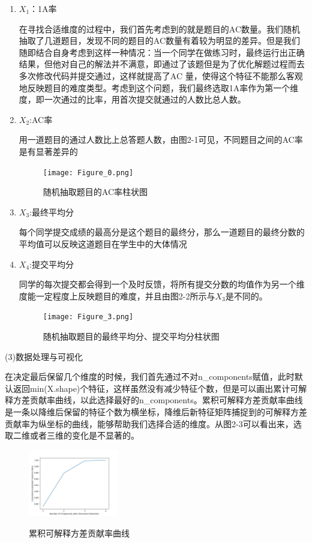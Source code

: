 \documentclass[UTF8]{ctexart}
\begin{document}
	\begin{enumerate}
		\item $X_1$：1A率
		\par 在寻找合适维度的过程中，我们首先考虑到的就是题目的AC数量。我们随机抽取了几道题目，发现不同的题目的AC数量有着较为明显的差异。但是我们随即结合自身考虑到这样一种情况：当一个同学在做练习时，最终运行出正确结果，但他对自己的解法并不满意，即通过了该题但是为了优化解题过程而去多次修改代码并提交通过，这样就提高了AC 量，使得这个特征不能那么客观地反映题目的难度类型。考虑到这个问题，我们最终选取1A率作为第一个维度，即一次通过的比率，用首次提交就通过的人数比总人数。
		\item $X_2$:AC率
		\par 用一道题目的通过人数比上总答题人数，由图2-1可见，不同题目之间的AC率是有显著差异的
		\begin{figure}[!htbp]
			\centering
			\texttt{[image: Figure\_0.png]}\\
			\caption{随机抽取题目的AC率柱状图}
		\end{figure}
		\item $X_3$:最终平均分
		\par 每个同学提交成绩的最高分是这个题目的最终分，那么一道题目的最终分数的平均值可以反映这道题目在学生中的大体情况
		\item $X_4$:提交平均分
		\par 同学的每次提交都会得到一个及时反馈，将所有提交分数的均值作为另一个维度能一定程度上反映题目的难度，并且由图2-2所示与$X_3$是不同的。
		\begin{figure}[!htbp]
			\centering
			\texttt{[image: Figure\_3.png]}\\
			\caption{随机抽取题目的最终平均分、提交平均分柱状图}
		\end{figure}
	\end{enumerate}
	\par (3)数据处理与可视化
	\par 在决定最后保留几个维度的时候，我们首先通过不对n\_components赋值，此时默认返回min(X.shape)个特征，这样虽然没有减少特征个数，但是可以画出累计可解释方差贡献率曲线，以此选择最好的n\_components。累积可解释方差贡献率曲线是一条以降维后保留的特征个数为横坐标，降维后新特征矩阵捕捉到的可解释方差贡献率为纵坐标的曲线，能够帮助我们选择合适的维度。从图2-3可以看出来，选取二维或者三维的变化是不显著的。
	\begin{figure}[!htbp]
		\centering
		\includegraphics[width=0.35\textwidth]{Figure_2.png}\\
		\caption{累积可解释方差贡献率曲线}
	\end{figure}
\end{document}
